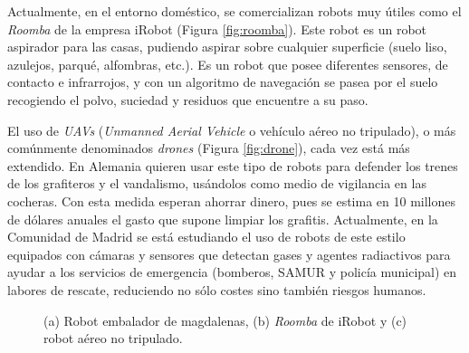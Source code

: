 Actualmente, en el entorno doméstico, se comercializan robots muy útiles como el \textit{Roomba} de la empresa iRobot (Figura \ref{fig:roomba}). Este robot es un robot aspirador para las casas, pudiendo aspirar sobre cualquier superficie (suelo liso, azulejos, parqué, alfombras, etc.). Es un robot que posee diferentes sensores, de contacto e infrarrojos, y con un algoritmo de navegación se pasea por el suelo recogiendo el polvo, suciedad y residuos que encuentre a su paso.

El uso de \textit{UAVs} (\textit{Unmanned Aerial Vehicle} o vehículo aéreo no tripulado), o más comúnmente denominados \textit{drones} (Figura \ref{fig:drone}), cada vez está más extendido. En Alemania quieren usar este tipo de robots para defender los trenes de los grafiteros y el vandalismo, usándolos como medio de vigilancia en las cocheras. Con esta medida esperan ahorrar dinero, pues se estima en 10 millones de dólares anuales el gasto que supone limpiar los grafitis. Actualmente, en la Comunidad de Madrid se está estudiando el uso de robots de este estilo equipados con cámaras y sensores que detectan gases y agentes radiactivos para ayudar a los servicios de emergencia (bomberos, SAMUR y policía municipal) en labores de rescate, reduciendo no sólo costes sino también riesgos humanos. 

\begin{figure}
	\begin{center}
		\hspace{0.1cm}
		\hspace{0.1cm}
	\end{center}
	\centering
	\captionsetup{justification=centering,margin=2cm}
	\caption{(a) Robot embalador de magdalenas, (b) \textit{Roomba} de iRobot y (c) robot aéreo no tripulado.}
	\label{fig:robots3}
\end{figure}

